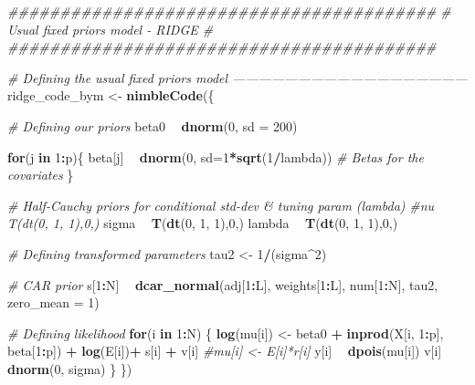 \documentclass[]{article}
\newenvironment{Shaded}{\begin{snugshade}}{\end{snugshade}}
\newcommand{\CommentTok}[1]{\textcolor[rgb]{0.56,0.35,0.01}{\textit{#1}}}
\newcommand{\ControlFlowTok}[1]{\textcolor[rgb]{0.13,0.29,0.53}{\textbf{#1}}}
\newcommand{\DataTypeTok}[1]{\textcolor[rgb]{0.13,0.29,0.53}{#1}}
\newcommand{\DecValTok}[1]{\textcolor[rgb]{0.00,0.00,0.81}{#1}}
\newcommand{\KeywordTok}[1]{\textcolor[rgb]{0.13,0.29,0.53}{\textbf{#1}}}
\newcommand{\NormalTok}[1]{#1}
\newcommand{\OperatorTok}[1]{\textcolor[rgb]{0.81,0.36,0.00}{\textbf{#1}}}
\newcommand{\StringTok}[1]{\textcolor[rgb]{0.31,0.60,0.02}{#1}}
\begin{document}
\begin{Shaded}
\begin{Highlighting}[]
\CommentTok{#########################################}
\CommentTok{#    Usual fixed priors model - RIDGE   # }
\CommentTok{#########################################}

\CommentTok{# Defining the usual fixed priors model ------------------------------------------------------}
\NormalTok{ridge_code_bym <-}\StringTok{ }\KeywordTok{nimbleCode}\NormalTok{(\{ }
  
  \CommentTok{# Defining our priors}
\NormalTok{  beta0 }\OperatorTok{~}\StringTok{ }\KeywordTok{dnorm}\NormalTok{(}\DecValTok{0}\NormalTok{, }\DataTypeTok{sd =} \DecValTok{200}\NormalTok{)}
  
  \ControlFlowTok{for}\NormalTok{(j }\ControlFlowTok{in} \DecValTok{1}\OperatorTok{:}\NormalTok{p)\{}
\NormalTok{    beta[j] }\OperatorTok{~}\StringTok{ }\KeywordTok{dnorm}\NormalTok{(}\DecValTok{0}\NormalTok{, }\DataTypeTok{sd=}\DecValTok{1}\OperatorTok{*}\KeywordTok{sqrt}\NormalTok{(}\DecValTok{1}\OperatorTok{/}\NormalTok{lambda))  }\CommentTok{# Betas for the covariates}
\NormalTok{  \}}
  
  \CommentTok{# Half-Cauchy priors for conditional std-dev & tuning param (lambda)}
  \CommentTok{#nu ~ T(dt(0, 1, 1),0,) }
\NormalTok{  sigma }\OperatorTok{~}\StringTok{ }\KeywordTok{T}\NormalTok{(}\KeywordTok{dt}\NormalTok{(}\DecValTok{0}\NormalTok{, }\DecValTok{1}\NormalTok{, }\DecValTok{1}\NormalTok{),}\DecValTok{0}\NormalTok{,) }
\NormalTok{  lambda }\OperatorTok{~}\StringTok{ }\KeywordTok{T}\NormalTok{(}\KeywordTok{dt}\NormalTok{(}\DecValTok{0}\NormalTok{, }\DecValTok{1}\NormalTok{, }\DecValTok{1}\NormalTok{),}\DecValTok{0}\NormalTok{,)}

  \CommentTok{# Defining transformed parameters}
\NormalTok{  tau2 <-}\StringTok{ }\DecValTok{1}\OperatorTok{/}\NormalTok{(sigma}\OperatorTok{^}\DecValTok{2}\NormalTok{)}
  
  \CommentTok{# CAR prior}
\NormalTok{  s[}\DecValTok{1}\OperatorTok{:}\NormalTok{N] }\OperatorTok{~}\StringTok{ }\KeywordTok{dcar_normal}\NormalTok{(adj[}\DecValTok{1}\OperatorTok{:}\NormalTok{L], weights[}\DecValTok{1}\OperatorTok{:}\NormalTok{L], num[}\DecValTok{1}\OperatorTok{:}\NormalTok{N], tau2, }\DataTypeTok{zero_mean =} \DecValTok{1}\NormalTok{)}
  
  \CommentTok{# Defining likelihood}
  \ControlFlowTok{for}\NormalTok{(i }\ControlFlowTok{in} \DecValTok{1}\OperatorTok{:}\NormalTok{N) \{ }
    \KeywordTok{log}\NormalTok{(mu[i]) <-}\StringTok{ }\NormalTok{beta0 }\OperatorTok{+}\StringTok{ }\KeywordTok{inprod}\NormalTok{(X[i, }\DecValTok{1}\OperatorTok{:}\NormalTok{p], beta[}\DecValTok{1}\OperatorTok{:}\NormalTok{p]) }\OperatorTok{+}\StringTok{ }\KeywordTok{log}\NormalTok{(E[i])}\OperatorTok{+}\StringTok{ }\NormalTok{s[i] }\OperatorTok{+}\StringTok{ }\NormalTok{v[i]}
    \CommentTok{#mu[i] <- E[i]*r[i]}
\NormalTok{    y[i] }\OperatorTok{~}\StringTok{ }\KeywordTok{dpois}\NormalTok{(mu[i])}
\NormalTok{    v[i] }\OperatorTok{~}\StringTok{ }\KeywordTok{dnorm}\NormalTok{(}\DecValTok{0}\NormalTok{, sigma)}
\NormalTok{  \}}
\NormalTok{\})}
\end{Highlighting}
\end{Shaded}
\end{document}
